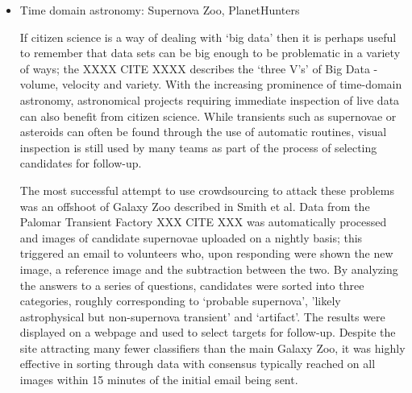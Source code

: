 \documentclass{ar2e}
\begin{document}
\begin{itemize}


\item Time domain astronomy: Supernova Zoo, PlanetHunters

If citizen science is a way of dealing with `big data' then it is perhaps
useful to remember that data sets can be big enough to be problematic in a
variety of ways; the XXXX CITE XXXX describes the `three V's' of Big Data -
volume, velocity and variety. With the increasing prominence of time-domain
astronomy, astronomical projects requiring immediate inspection of live data
can also benefit from citizen science. While transients such as supernovae or
asteroids can often be found through the use of automatic routines, visual
inspection is still used by many teams as part of the process of selecting
candidates for follow-up. 

The most successful attempt to use crowdsourcing to attack these problems was
an offshoot of Galaxy Zoo described in Smith et al. Data from the Palomar
Transient Factory XXX CITE XXX was automatically processed and images of
candidate supernovae uploaded on a nightly basis; this triggered an email to
volunteers who, upon responding were shown the new image, a reference image
and the subtraction between the two. By analyzing the answers to a series of
questions, candidates were sorted into three categories, roughly corresponding
to `probable supernova', 'likely astrophysical but non-supernova transient'
and `artifact'. The results were displayed on a webpage and used to select
targets for follow-up. Despite the site attracting many fewer classifiers than
the main Galaxy Zoo, it was highly effective in sorting through data with
consensus typically reached on all images within 15 minutes of the initial
email being sent. 


\end{itemize}
\end{document}
